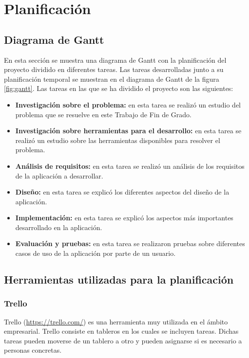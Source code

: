 \section{Planificación}
\subsection[Diagrama de Gantt]{Diagrama de Gantt}
En esta sección se muestra una diagrama de Gantt con la planificación del proyecto dividido en diferentes tareas. Las tareas desarrolladas junto a su planificación temporal se muestran en el diagrama de Gantt de la figura \ref{fig:gantt}. Las tareas en las que se ha dividido el proyecto son las siguientes:
\begin{itemize}
	\item \textbf{Investigación sobre el problema:} en esta tarea se realizó un estudio del problema que se resuelve en este Trabajo de Fin de Grado.
	\item \textbf{Investigación sobre herramientas para el desarrollo:} en esta tarea se realizó un estudio sobre las herramientas disponibles para resolver el problema.
	\item \textbf{Análisis de requisitos:} en esta tarea se realizó un análisis de los requisitos de la aplicación a desarrollar.
	\item \textbf{Diseño:} en esta tarea se explicó los diferentes aspectos del diseño de la aplicación.
	\item \textbf{Implementación:} en esta tarea se explicó los aspectos más importantes desarrollado en la aplicación.
	\item \textbf{Evaluación y pruebas:} en esta tarea se realizaron pruebas sobre diferentes casos de uso de la aplicación por parte de un usuario.
\end{itemize}

\subsection[Herramientas utilizadas para la planificación]{Herramientas utilizadas para la planificación}
\subsubsection{Trello}
Trello \cite{trello} (\href{https://trello.com/}{https://trello.com/}) es una herramienta muy utilizada en el ámbito empresarial. Trello consiste en tableros en los cuales se incluyen tareas. Dichas tareas pueden moverse de un tablero a otro y pueden asignarse si es necesario a personas concretas.\newline

